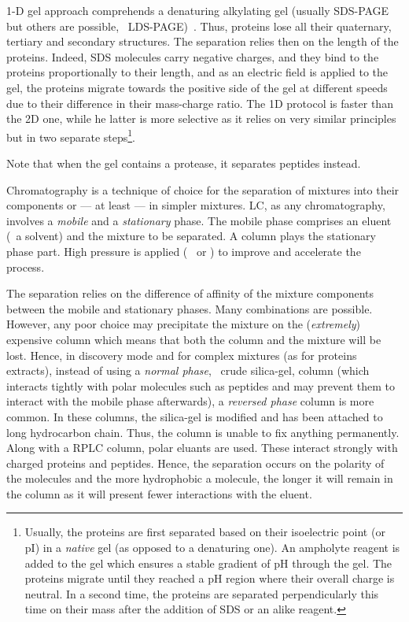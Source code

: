 1-D gel approach comprehends a denaturing alkylating gel
(usually \gls{SDS-PAGE} but others are possible,
\eg\ \gls{LDS-PAGE})~.
Thus, proteins lose all their quaternary, tertiary and secondary structures.
The separation relies then on the length of the proteins.
Indeed, \gls{SDS} molecules carry negative charges,
and they bind to the proteins proportionally to their length, and as an
electric field is applied to the gel, the proteins migrate towards the positive
side of the gel at different speeds due to their difference in their mass-charge
ratio.
The 1D protocol is faster than the 2D one, while he latter is more selective
as it relies on very similar principles but in two separate
steps\footnote{Usually, the proteins are first separated based on their
isoelectric point (or pI) in a \emph{native} gel (as opposed to a denaturing one).
An \gls{ampholyte} reagent is added to the gel which ensures a stable
gradient of \gls{pH} through the gel. The proteins migrate until they reached a
\gls{pH} region where their overall charge is neutral. In a second time, the
proteins are separated perpendicularly this time on their mass after the addition
of \gls{SDS} or an alike reagent.}.\mybr\

Note that when the gel contains a protease, it separates peptides instead.\mybr\


\vspace{-0.5mm}
Chromatography is a technique of choice for the separation of mixtures into their
components or --- at least --- in simpler mixtures. \gls{LC}, as any
chromatography, involves a \emph{mobile} and a \emph{stationary} phase.
The mobile phase comprises an eluent (\ie\ a solvent) and the mixture to be
separated. A column plays the stationary phase part.
High pressure is applied (\eg\  or )
to improve and accelerate the process.\mybr\

\vspace{-0.5mm}
The separation relies on the difference of affinity of the mixture components
between the mobile and stationary phases. Many combinations are possible. However,
any poor choice may precipitate the mixture on the (\emph{extremely})
expensive column which means that both the column and the mixture will be lost.
Hence, in discovery mode and for complex mixtures (as for proteins extracts),
instead of using a \emph{normal phase}, \ie\ crude silica-gel, column (which
interacts tightly with polar molecules such as peptides and may prevent them to
interact with the mobile phase afterwards), a \emph{reversed phase} column
is more common. In these columns, the silica-gel is modified and has been
attached to long hydrocarbon chain. Thus, the column is unable to fix anything
permanently. Along with a \gls{RPLC} column, polar eluants are used. These
interact strongly with charged proteins and peptides. Hence, the separation
occurs on the polarity of the molecules and the more hydrophobic a molecule,
the longer it will remain in the column as it will present fewer interactions
with the eluent.\mybr\

